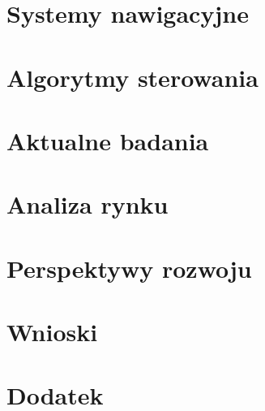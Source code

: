 \documentclass[12pt,twoside]{report} %
\begin{document}
\chapter{Systemy nawigacyjne}


\chapter{Algorytmy sterowania}


\chapter{Aktualne badania}


\chapter{Analiza rynku}


\chapter{Perspektywy rozwoju}


\chapter{Wnioski}


\appendix
\chapter{Dodatek}


\listoffigures

\printbibliography[
heading=bibintoc
]
%
%
\end{document}
